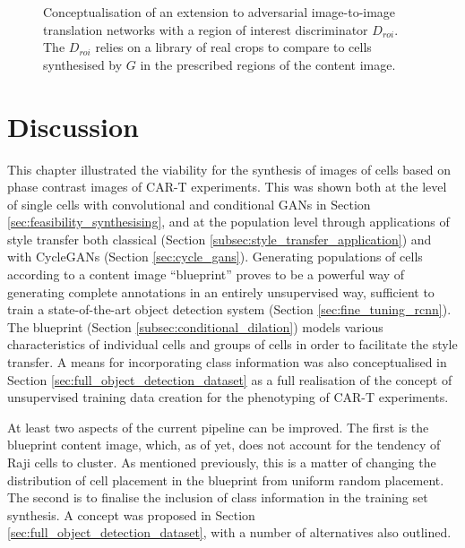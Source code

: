 \begin{figure}[h]
\caption{Conceptualisation of an extension to adversarial image-to-image translation networks with a region of interest discriminator $D_{roi}$. The $D_{roi}$ relies on a library of real crops to compare to cells synthesised by $G$ in the prescribed regions of the content image.}
\label{fig:roi_gan}
\end{figure}

\section{Discussion}

This chapter illustrated the viability for the synthesis of images of cells based on phase contrast images of CAR-T experiments. This was shown both at the level of single cells with convolutional and conditional GANs in Section \ref{sec:feasibility_synthesising}, and at the population level through applications of style transfer both classical (Section \ref{subsec:style_transfer_application}) and with CycleGANs (Section \ref{sec:cycle_gans}). Generating populations of cells according to a content image ``blueprint'' proves to be a powerful way of generating complete annotations in an entirely unsupervised way, sufficient to train a state-of-the-art object detection system (Section \ref{sec:fine_tuning_rcnn}). The blueprint (Section  \ref{subsec:conditional_dilation}) models various characteristics of individual cells and groups of cells in order to facilitate the style transfer. A means for incorporating class information was also conceptualised in Section \ref{sec:full_object_detection_dataset} as a full realisation of the concept of unsupervised training data creation for the phenotyping of CAR-T experiments.

At least two aspects of the current pipeline can be improved. The first is the blueprint content image, which, as of yet, does not account for the tendency of Raji cells to cluster. As mentioned previously, this is a matter of changing the distribution of cell placement in the blueprint from uniform random placement. The second is to finalise the inclusion of class information in the training set synthesis. A concept was proposed in Section \ref{sec:full_object_detection_dataset}, with a number of alternatives also outlined.
